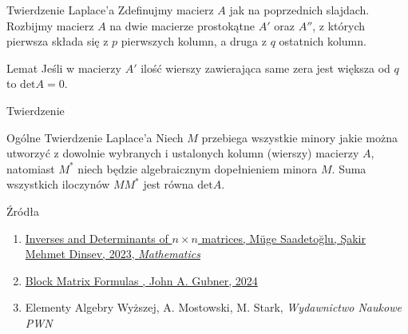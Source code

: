 \documentclass{beamer}
\renewcommand{\det}{\textrm{det}}
\begin{document}
\begin{frame}{Twierdzenie Laplace'a}
    Zdefinujmy macierz $A$ jak na poprzednich slajdach.
    Rozbijmy macierz $A$ na dwie macierze prostokątne $A'$ oraz $A''$, z których 
    pierwsza składa się z $p$ pierwszych kolumn, a druga z $q$ ostatnich kolumn.
    \begin{block}{Lemat}
        Jeśli w macierzy $A'$ ilość wierszy zawierająca same zera jest większa od $q$ to $\det A = 0$.
    \end{block}
\end{frame}

\begin{frame}{Twierdzenie}
    \begin{block}{Ogólne Twierdzenie Laplace'a}
        Niech $M$ przebiega wszystkie minory jakie można utworzyć
        z dowolnie wybranych i ustalonych kolumn (wierszy) macierzy $A$, natomiast $M^*$ niech będzie algebraicznym dopełnieniem minora $M$.
        Suma wszystkich iloczynów $M M^*$ jest równa $\det A$.
    \end{block}
\end{frame}

\begin{frame}{Źródła}
    \begin{enumerate}
        \item \href{https://www.mdpi.com/2227-7390/11/17/3784}{Inverses and Determinants of $n \times n$ matrices, Müge Saadetoğlu, Şakir Mehmet Dinsev, 2023, \textit{Mathematics}}
        \item \href{https://gubner.ece.wisc.edu/notes/BlockMatrixFormulas.pdf}{Block Matrix Formulas , John A. Gubner, 2024}
        \item Elementy Algebry Wyższej, A. Mostowski, M. Stark, \textit{Wydawnictwo Naukowe PWN }
    \end{enumerate}
\end{frame}
\end{document}
